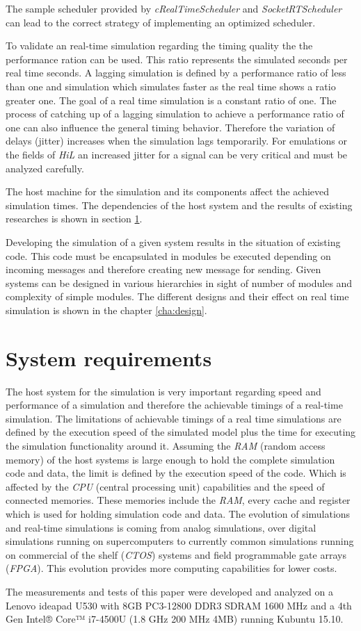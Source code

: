The sample scheduler provided by \emph{cRealTimeScheduler} and \emph{SocketRTScheduler} can lead to the correct strategy of implementing an optimized scheduler.

To validate an real-time simulation regarding the timing quality the the performance ration can be used.
This ratio represents the simulated seconds per real time seconds.
A lagging simulation is defined by a performance ratio of less than one and simulation which simulates faster as the real time shows a ratio greater one.
The goal of a real time simulation is a constant ratio of one.
The process of catching up of a lagging simulation to achieve a performance ratio of one can also influence the general timing behavior.
Therefore the variation of delays (jitter) increases when the simulation lags temporarily.
For emulations or the fields of \emph{HiL} an increased jitter for a signal can be very critical and must be analyzed carefully.

The host machine for the simulation and its components affect the achieved simulation times.
The dependencies of the host system and the results of existing researches is shown in section \ref{sec:simulation_requirements}.

Developing the simulation of a given system results in the situation of existing code.
This code must be encapsulated in modules be executed depending on incoming messages and therefore creating new message for sending.
Given systems can be designed in various hierarchies in sight of number of modules and complexity of simple modules.
The different designs and their effect on real time simulation is shown in the chapter \ref{cha:design}.

\section{System requirements}
\label{sec:simulation_requirements}
The host system for the simulation is very important regarding speed and performance of a simulation and therefore the achievable timings of a real-time simulation.
The limitations of achievable timings of a real time simulations are defined by the execution speed of the simulated model plus the time for executing the simulation functionality around it.
Assuming the \emph{RAM} (random access memory) of the host systems is large enough to hold the complete simulation code and data, the limit is defined by the execution speed of the code.
Which is affected by the \emph{CPU} (central processing unit) capabilities and the speed of connected memories.
These memories include the \emph{RAM}, every cache and register which is used for holding simulation code and data.
The evolution of simulations and real-time simulations is coming from analog simulations, over digital simulations running on supercomputers to currently common simulations running on commercial of the shelf (\emph{CTOS}) systems and field programmable gate arrays (\emph{FPGA}).
This evolution provides more computing capabilities for lower costs. \cite[section IV]{belanger_what_2010}

The measurements and tests of this paper were developed and analyzed on a Lenovo ideapad U530 with 8GB PC3-12800 DDR3 SDRAM 1600 MHz and a 4th Gen Intel® Core™ i7-4500U (1.8 GHz 200 MHz 4MB) running Kubuntu 15.10.
\cite{lenovo_spec}